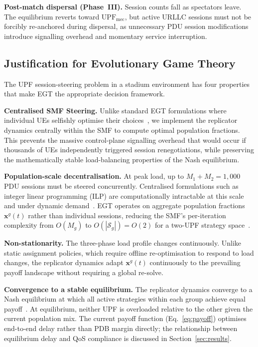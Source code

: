 \documentclass[conference]{IEEEtran}
\begin{document}
\textbf{Post-match dispersal (Phase~III).} Session
counts fall as spectators leave. The equilibrium
reverts toward $\text{UPF}_\text{mec}$, but active
URLLC sessions must not be forcibly re-anchored
during dispersal, as unnecessary PDU session
modifications introduce signalling overhead and
momentary service interruption.

\subsection{Justification for Evolutionary Game Theory}
\label{sec:egt_justify}

The UPF session-steering problem in a stadium environment
has four properties that make EGT the appropriate
decision framework.

\textbf{Centralised SMF Steering.} Unlike standard EGT 
formulations where individual UEs selfishly optimise their 
choices~\cite{Alevizaki2021upf}, we implement the replicator 
dynamics centrally within the SMF to compute optimal population 
fractions. This prevents the massive control-plane signalling 
overhead that would occur if thousands of UEs independently 
triggered session renegotiations, while preserving the mathematically 
stable load-balancing properties of the Nash equilibrium.

\textbf{Population-scale decentralisation.} At peak
load, up to $M_1 + M_2 = 1{,}000$ PDU sessions must be
steered concurrently. Centralised formulations such as
integer linear programming (ILP) are computationally
intractable at this scale and under dynamic
demand~\cite{LeyvaUPC2023}. EGT operates on aggregate
population fractions $\mathbf{x}^g(t)$ rather than
individual sessions, reducing the SMF's per-iteration
complexity from $O(M_g)$ to $O(|\mathcal{S}_g|) = O(2)$
for a two-UPF strategy space~\cite{Alevizaki2021upf}.

\textbf{Non-stationarity.} The three-phase load profile
changes continuously. Unlike static assignment policies,
which require offline re-optimisation to respond to load
changes, the replicator dynamics adapt $\mathbf{x}^g(t)$
continuously to the prevailing payoff landscape without
requiring a global re-solve.

\textbf{Convergence to a stable equilibrium.} The
replicator dynamics converge to a Nash equilibrium at
which all active strategies within each group achieve
equal payoff~\cite{Alevizaki2021upf}. At equilibrium,
neither UPF is overloaded relative to the other given
the current population mix. The current payoff function
(Eq.~\eqref{eq:payoff}) optimises end-to-end delay
rather than PDB margin directly; the relationship between
equilibrium delay and QoS compliance is discussed in
Section~\ref{sec:results}.
\end{document}
